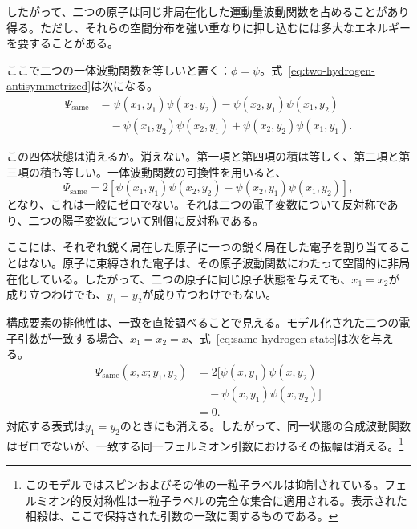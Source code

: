 したがって、二つの原子は同じ非局在化した運動量波動関数を占めることがあり得る。ただし、それらの空間分布を強い重なりに押し込むには多大なエネルギーを要することがある。

ここで二つの一体波動関数を等しいと置く：\(\phi=\psi\)。式~\eqref{eq:two-hydrogen-antisymmetrized}は次になる。
\begin{align}
\Psi_{\mathrm{same}}
&=\psi(x_1,y_1)\psi(x_2,y_2)
-\psi(x_2,y_1)\psi(x_1,y_2)\nonumber\\
&\quad
-\psi(x_1,y_2)\psi(x_2,y_1)
+\psi(x_2,y_2)\psi(x_1,y_1).
\end{align}

この四体状態は消えるか。消えない。第一項と第四項の積は等しく、第二項と第三項の積も等しい。一体波動関数の可換性を用いると、
\begin{equation}
\Psi_{\mathrm{same}}
=
2\left[
\psi(x_1,y_1)\psi(x_2,y_2)
-\psi(x_2,y_1)\psi(x_1,y_2)
\right],
\label{eq:same-hydrogen-state}
\end{equation}
となり、これは一般にゼロでない。それは二つの電子変数について反対称であり、二つの陽子変数について別個に反対称である。

ここには、それぞれ鋭く局在した原子に一つの鋭く局在した電子を割り当てることはない。原子に束縛された電子は、その原子波動関数にわたって空間的に非局在化している。したがって、二つの原子に同じ原子状態を与えても、\(x_1=x_2\)が成り立つわけでも、\(y_1=y_2\)が成り立つわけでもない。

構成要素の排他性は、一致を直接調べることで見える。モデル化された二つの電子引数が一致する場合、\(x_1=x_2=x\)、式~\eqref{eq:same-hydrogen-state}は次を与える。
\begin{align}
\Psi_{\mathrm{same}}(x,x;y_1,y_2)
&=2\bigl[
\psi(x,y_1)\psi(x,y_2)\nonumber\\
&\quad{}-\psi(x,y_1)\psi(x,y_2)
\bigr]\\
&=0.
\end{align}
対応する表式は\(y_1=y_2\)のときにも消える。したがって、同一状態の合成波動関数はゼロでないが、一致する同一フェルミオン引数におけるその振幅は消える。\footnote{このモデルではスピンおよびその他の一粒子ラベルは抑制されている。フェルミオン的反対称性は一粒子ラベルの完全な集合に適用される。表示された相殺は、ここで保持された引数の一致に関するものである。}

\begin{classroomqa}
\end{classroomqa}

